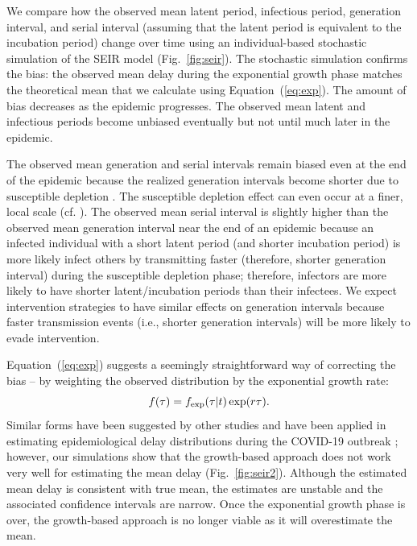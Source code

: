 \documentclass[12pt]{article}
\newcommand{\eref}[1]{(\ref{eq:#1})}
\newcommand{\fref}[1]{Fig.~\ref{fig:#1}}
\begin{document}
We compare how the observed mean latent period, infectious period, generation interval, and serial interval (assuming that the latent period is equivalent to the incubation period) change over time using an individual-based stochastic simulation of the SEIR model (\fref{seir}).
The stochastic simulation confirms the bias: the observed mean delay during the exponential growth phase matches the theoretical mean that we calculate using Equation~\eref{exp}.
The amount of bias decreases as the epidemic progresses.
The observed mean latent and infectious periods become unbiased eventually but not until much later in the epidemic.

The observed mean generation and serial intervals remain biased even at the end of the epidemic because the realized generation intervals become shorter due to susceptible depletion \citep{champredon2015intrinsic}.
The susceptible depletion effect can even occur at a finer, local scale (cf. \cite{park2019inferring}).
The observed mean serial interval is slightly higher than the observed mean generation interval near the end of an epidemic because an infected individual with a short latent period (and shorter incubation period) is more likely infect others by transmitting faster (therefore, shorter generation interval) during the susceptible depletion phase; therefore, infectors are more likely to have shorter latent/incubation periods than their infectees.
We expect intervention strategies to have similar effects on generation intervals because faster transmission events (i.e., shorter generation intervals) will be more likely to evade intervention.

Equation~\eref{exp} suggests a seemingly straightforward way of correcting the bias -- by weighting the observed distribution by the exponential growth rate:
\begin{equation}
\label{eq:exp}
f(\tau) = f_{\tiny\textrm{exp}}(\tau|t) \exp(r \tau).
\end{equation}
Similar forms have been suggested by other studies \citep{britton2019estimation, park2019inferring} and have been applied in estimating epidemiological delay distributions during the COVID-19 outbreak \citep{nishiura2020serial, linton2020incubation};
however, our simulations show that the growth-based approach does not work very well for estimating the mean delay (\fref{seir2}).
Although the estimated mean delay is consistent with true mean, the estimates are unstable and the associated confidence intervals are narrow.
Once the exponential growth phase is over, the growth-based approach is no longer viable as it will overestimate the mean.
\end{document}
